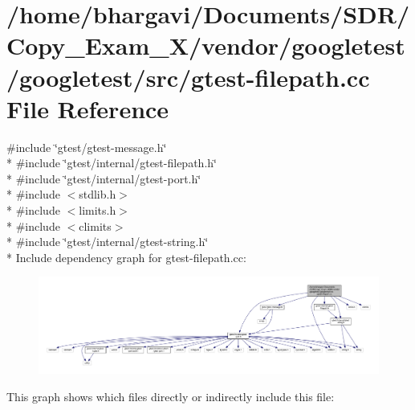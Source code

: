 \hypertarget{gtest-filepath_8cc}{}\section{/home/bhargavi/\+Documents/\+S\+D\+R/\+Copy\+\_\+\+Exam\+\_\+X/vendor/googletest/googletest/src/gtest-\/filepath.cc File Reference}
\label{gtest-filepath_8cc}
{\ttfamily \#include \char`\"{}gtest/gtest-\/message.\+h\char`\"{}}\\*
{\ttfamily \#include \char`\"{}gtest/internal/gtest-\/filepath.\+h\char`\"{}}\\*
{\ttfamily \#include \char`\"{}gtest/internal/gtest-\/port.\+h\char`\"{}}\\*
{\ttfamily \#include $<$stdlib.\+h$>$}\\*
{\ttfamily \#include $<$limits.\+h$>$}\\*
{\ttfamily \#include $<$climits$>$}\\*
{\ttfamily \#include \char`\"{}gtest/internal/gtest-\/string.\+h\char`\"{}}\\*
Include dependency graph for gtest-\/filepath.cc\+:
\nopagebreak
\begin{figure}[H]
\begin{center}
\leavevmode
\includegraphics[width=350pt]{gtest-filepath_8cc__incl}
\end{center}
\end{figure}
This graph shows which files directly or indirectly include this file\+:
\nopagebreak
